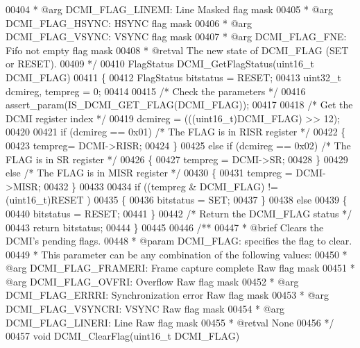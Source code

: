 \begin{DoxyCode}
00404 \textcolor{comment}{  *            @arg DCMI\_FLAG\_LINEMI: Line Masked flag mask}
00405 \textcolor{comment}{  *            @arg DCMI\_FLAG\_HSYNC: HSYNC flag mask}
00406 \textcolor{comment}{  *            @arg DCMI\_FLAG\_VSYNC: VSYNC flag mask}
00407 \textcolor{comment}{  *            @arg DCMI\_FLAG\_FNE: Fifo not empty flag mask}
00408 \textcolor{comment}{  * @retval The new state of DCMI\_FLAG (SET or RESET).}
00409 \textcolor{comment}{  */}
00410 FlagStatus DCMI_GetFlagStatus(uint16\_t DCMI\_FLAG)
00411 \{
00412   FlagStatus bitstatus = RESET;
00413   uint32\_t dcmireg, tempreg = 0;
00414 
00415   \textcolor{comment}{/* Check the parameters */}
00416   assert_param(IS\_DCMI\_GET\_FLAG(DCMI\_FLAG));
00417 
00418   \textcolor{comment}{/* Get the DCMI register index */}
00419   dcmireg = (((uint16\_t)DCMI\_FLAG) >> 12);
00420 
00421   \textcolor{keywordflow}{if} (dcmireg == 0x01) \textcolor{comment}{/* The FLAG is in RISR register */}
00422   \{
00423     tempreg= DCMI->RISR;
00424   \}
00425   \textcolor{keywordflow}{else} \textcolor{keywordflow}{if} (dcmireg == 0x02) \textcolor{comment}{/* The FLAG is in SR register */}
00426   \{
00427     tempreg = DCMI->SR;
00428   \}
00429   \textcolor{keywordflow}{else} \textcolor{comment}{/* The FLAG is in MISR register */}
00430   \{
00431     tempreg = DCMI->MISR;
00432   \}
00433 
00434   \textcolor{keywordflow}{if} ((tempreg & DCMI\_FLAG) != (uint16\_t)RESET )
00435   \{
00436     bitstatus = SET;
00437   \}
00438   \textcolor{keywordflow}{else}
00439   \{
00440     bitstatus = RESET;
00441   \}
00442   \textcolor{comment}{/* Return the DCMI\_FLAG status */}
00443   \textcolor{keywordflow}{return}  bitstatus;
00444 \}
00445 
00446 \textcolor{comment}{/**}
00447 \textcolor{comment}{  * @brief  Clears the DCMI's pending flags.}
00448 \textcolor{comment}{  * @param  DCMI\_FLAG: specifies the flag to clear.}
00449 \textcolor{comment}{  *          This parameter can be any combination of the following values:}
00450 \textcolor{comment}{  *            @arg DCMI\_FLAG\_FRAMERI: Frame capture complete Raw flag mask}
00451 \textcolor{comment}{  *            @arg DCMI\_FLAG\_OVFRI: Overflow Raw flag mask}
00452 \textcolor{comment}{  *            @arg DCMI\_FLAG\_ERRRI: Synchronization error Raw flag mask}
00453 \textcolor{comment}{  *            @arg DCMI\_FLAG\_VSYNCRI: VSYNC Raw flag mask}
00454 \textcolor{comment}{  *            @arg DCMI\_FLAG\_LINERI: Line Raw flag mask}
00455 \textcolor{comment}{  * @retval None}
00456 \textcolor{comment}{  */}
00457 \textcolor{keywordtype}{void} DCMI_ClearFlag(uint16\_t DCMI\_FLAG)

\end{DoxyCode}
